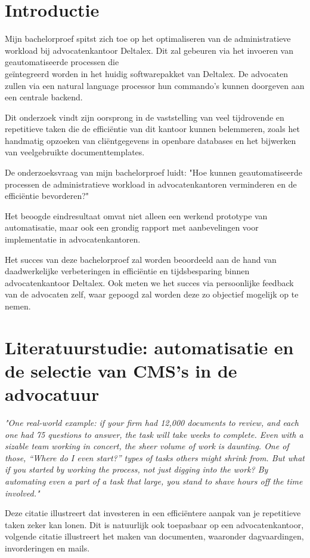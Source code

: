 \section{Introductie}%
\label{sec:introductie}
Mijn bachelorproef spitst zich toe op het optimaliseren van de administratieve workload bij advocatenkantoor Deltalex. Dit zal gebeuren via het invoeren van geautomatiseerde processen die \\geïntegreerd worden in het huidig softwarepakket van Deltalex. 
De advocaten zullen via een natural language processor hun commando's kunnen doorgeven aan een centrale backend.

Dit onderzoek vindt zijn oorsprong in de vaststelling van veel tijdrovende en repetitieve taken die de efficiëntie van dit kantoor kunnen belemmeren,
zoals het handmatig opzoeken van cliëntgegevens in openbare databases en het bijwerken van veelgebruikte documenttemplates.

De onderzoeksvraag van mijn bachelorproef luidt: "Hoe kunnen geautomatiseerde processen de administratieve
workload in advocatenkantoren verminderen en de efficiëntie bevorderen?"

Het beoogde eindresultaat omvat niet alleen een werkend prototype van automatisatie,
maar ook een grondig rapport met aanbevelingen voor implementatie in advocatenkantoren.

Het succes van deze bachelorproef zal worden beoordeeld aan de hand van daadwerkelijke verbeteringen in efficiëntie en
tijdsbesparing binnen advocatenkantoor Deltalex. Ook meten we het succes via persoonlijke feedback van de advocaten zelf, waar gepoogd zal worden deze zo objectief mogelijk op te nemen.

\section{Literatuurstudie: automatisatie en de selectie van CMS's in de advocatuur}%
\label{sec:state-of-the-art}

\begin{displayquote}
	\textit{"One real-world example: if your firm had 12,000 documents to review, and each one had 75 questions to answer, the task will take weeks to complete. Even with a sizable team working in concert, the sheer volume of work is daunting. One of those, “Where do I even start?” types of tasks others might shrink from.
		But what if you started by working the process, not just digging into the work? By automating even a part of a task that large, you stand to shave hours off the time involved."}
	\autocite{ThomsonReuters2023}
\end{displayquote}
Deze citatie illustreert dat investeren in een efficiëntere aanpak van je repetitieve taken zeker kan lonen. Dit is natuurlijk ook toepasbaar op een advocatenkantoor, volgende citatie illustreert het maken van documenten, waaronder dagvaardingen, invorderingen en mails.

